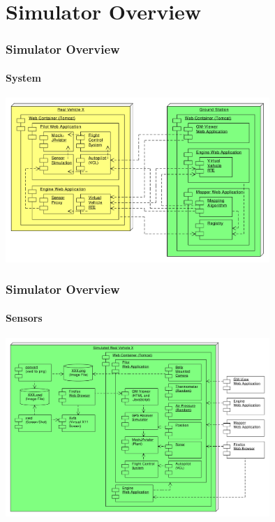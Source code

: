 \documentclass{beamer}
\begin{document}
\section {Simulator Overview}

\begin{frame}\frametitle{Simulator Overview}\framesubtitle{System}
        \begin{center}
                {\includegraphics[width=10cm]{SystemOverview.pdf}}
        \end{center}
\end{frame}


\begin{frame}\frametitle{Simulator Overview}\framesubtitle{Sensors}
        \begin{center}
                {\includegraphics[width=10cm]{SensorSimulation-3.pdf}}
        \end{center}
\end{frame}
\end{document}
